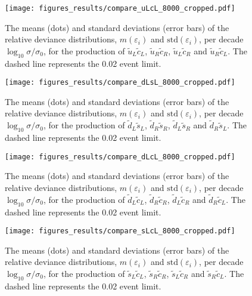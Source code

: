\documentclass[twoside,english]{uiofysmaster}
\begin{document}
{{\begin{appendices}
\begin{figure}
\centering
\texttt{[image: figures\_results/compare\_uLcL\_8000\_cropped.pdf]}
\caption[Relative deviance distributions $\widetilde{u}_L \widetilde{c}_L$, $\widetilde{u}_R \widetilde{c}_R$, $\widetilde{u}_L \widetilde{c}_R$ and $\widetilde{u}_R \widetilde{c}_L$]{The means (dots) and standard deviations (error bars) of the relative deviance distributions, $m(\varepsilon_i)$ and $\mathrm{std}(\varepsilon_i)$, per decade $\log_{10} \sigma / \sigma_0$, for the production of $\widetilde{u}_L \widetilde{c}_L$, $\widetilde{u}_R \widetilde{c}_R$, $\widetilde{u}_L \widetilde{c}_R$ and $\widetilde{u}_R \widetilde{c}_L$. The dashed line represents the 0.02 event limit.}
\end{figure}

\begin{figure}
\centering
\texttt{[image: figures\_results/compare\_dLsL\_8000\_cropped.pdf]}
\caption[Relative deviance distributions $\widetilde{d}_L \widetilde{s}_L$, $\widetilde{d}_R \widetilde{s}_R$, $\widetilde{d}_L \widetilde{s}_R$ and $\widetilde{d}_R \widetilde{s}_L$]{The means (dots) and standard deviations (error bars) of the relative deviance distributions, $m(\varepsilon_i)$ and $\mathrm{std}(\varepsilon_i)$, per decade $\log_{10} \sigma / \sigma_0$, for the production of $\widetilde{d}_L \widetilde{s}_L$, $\widetilde{d}_R \widetilde{s}_R$, $\widetilde{d}_L \widetilde{s}_R$ and $\widetilde{d}_R \widetilde{s}_L$. The dashed line represents the 0.02 event limit.}
\end{figure}

\begin{figure}
\centering
\texttt{[image: figures\_results/compare\_dLcL\_8000\_cropped.pdf]}
\caption[Relative deviance distributions $\widetilde{d}_L \widetilde{c}_L$, $\widetilde{d}_R \widetilde{c}_R$, $\widetilde{d}_L \widetilde{c}_R$ and $\widetilde{d}_R \widetilde{c}_L$]{The means (dots) and standard deviations (error bars) of the relative deviance distributions, $m(\varepsilon_i)$ and $\mathrm{std}(\varepsilon_i)$, per decade $\log_{10} \sigma / \sigma_0$, for the production of $\widetilde{d}_L \widetilde{c}_L$, $\widetilde{d}_R \widetilde{c}_R$, $\widetilde{d}_L \widetilde{c}_R$ and $\widetilde{d}_R \widetilde{c}_L$. The dashed line represents the 0.02 event limit.}
\end{figure}

\begin{figure}
\centering
\texttt{[image: figures\_results/compare\_sLcL\_8000\_cropped.pdf]}
\caption[Relative deviance distributions $\widetilde{s}_L \widetilde{c}_L$, $\widetilde{s}_R \widetilde{c}_R$, $\widetilde{s}_L \widetilde{c}_R$ and $\widetilde{s}_R \widetilde{c}_L$]{The means (dots) and standard deviations (error bars) of the relative deviance distributions, $m(\varepsilon_i)$ and $\mathrm{std}(\varepsilon_i)$, per decade $\log_{10} \sigma / \sigma_0$, for the production of $\widetilde{s}_L \widetilde{c}_L$, $\widetilde{s}_R \widetilde{c}_R$, $\widetilde{s}_L \widetilde{c}_R$ and $\widetilde{s}_R \widetilde{c}_L$. The dashed line represents the 0.02 event limit.}
\end{figure}



\end{appendices}}}
\end{document}
